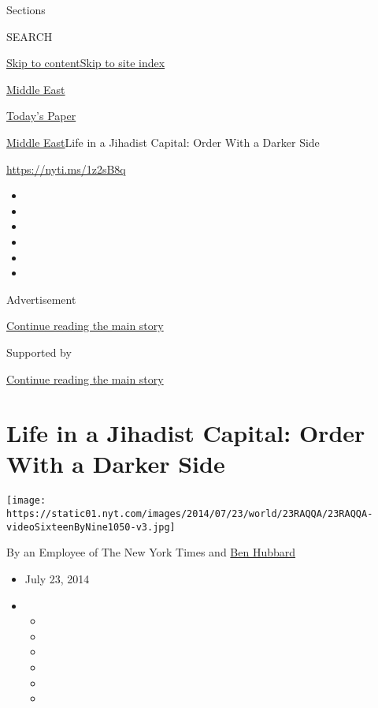 Sections

SEARCH

\protect\hyperlink{site-content}{Skip to
content}\protect\hyperlink{site-index}{Skip to site index}

\href{https://www.nytimes.com/section/world/middleeast}{Middle East}

\href{https://myaccount.nytimes.com/auth/login?response_type=cookie\&client_id=vi}{}

\href{https://www.nytimes.com/section/todayspaper}{Today's Paper}

\href{/section/world/middleeast}{Middle East}\textbar{}Life in a
Jihadist Capital: Order With a Darker Side

\url{https://nyti.ms/1z2sB8q}

\begin{itemize}
\item
\item
\item
\item
\item
\item
\end{itemize}

Advertisement

\protect\hyperlink{after-top}{Continue reading the main story}

Supported by

\protect\hyperlink{after-sponsor}{Continue reading the main story}

\hypertarget{life-in-a-jihadist-capital-order-with-a-darker-side}{%
\section{Life in a Jihadist Capital: Order With a Darker
Side}\label{life-in-a-jihadist-capital-order-with-a-darker-side}}

\texttt{[image: https://static01.nyt.com/images/2014/07/23/world/23RAQQA/23RAQQA-videoSixteenByNine1050-v3.jpg]}

By an Employee of The New York Times and
\href{http://www.nytimes.com/by/ben-hubbard}{Ben Hubbard}

\begin{itemize}
\item
  July 23, 2014
\item
  \begin{itemize}
  \item
  \item
  \item
  \item
  \item
  \item
  \end{itemize}
\end{itemize}

